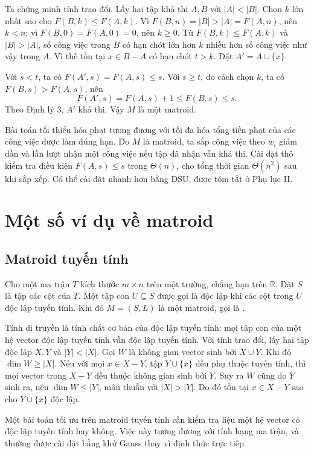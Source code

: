 \documentclass[11pt]{article}
\begin{document}
Ta chứng minh tính trao đổi. Lấy hai tập khả thi \(A,B\) với \(|A|<|B|\). Chọn
\(k\) lớn nhất sao cho \(F(B,k)\le F(A,k)\). Vì
\(F(B,n)=|B|>|A|=F(A,n)\), nên \(k<n\); vì \(F(B,0)=F(A,0)=0\), nên \(k\ge 0\).
Từ \(F(B,k)\le F(A,k)\) và \(|B|>|A|\), số công việc trong \(B\) có hạn chót
lớn hơn \(k\) nhiều hơn số công việc như vậy trong \(A\). Vì thế tồn tại
\(x\in B-A\) có hạn chót \(t>k\). Đặt \(A'=A\cup\{x\}\).

Với \(s<t\), ta có \(F(A',s)=F(A,s)\le s\). Với \(s\ge t\), do cách chọn \(k\),
ta có \(F(B,s)>F(A,s)\), nên
\[
  F(A',s)=F(A,s)+1\le F(B,s)\le s.
\]
Theo Định lý 3, \(A'\) khả thi. Vậy \(M\) là một matroid.

Bài toán tối thiểu hóa phạt tương đương với tối đa hóa tổng tiền phạt của các
công việc được làm đúng hạn. Do \(M\) là matroid, ta sắp công việc theo
\(w_i\) giảm dần và lần lượt nhận một công việc nếu tập đã nhận vẫn khả thi.
Cài đặt thô kiểm tra điều kiện \(F(A,s)\le s\) trong \(\Theta(n)\), cho tổng
thời gian \(\Theta(n^2)\) sau khi sắp xếp. Có thể cài đặt nhanh hơn bằng DSU,
được tóm tắt ở Phụ lục II.

\section{Một số ví dụ về matroid}

\subsection*{Matroid tuyến tính}

Cho một ma trận \(T\) kích thước \(m\times n\) trên một trường, chẳng hạn trên
\(\mathbb{R}\). Đặt \(S\) là tập các cột của \(T\). Một tập con \(U\subseteq S\)
được gọi là độc lập khi các cột trong \(U\) độc lập tuyến tính. Khi đó
\(M=(S,L)\) là một matroid, gọi là .

Tính di truyền là tính chất cơ bản của độc lập tuyến tính: mọi tập con của một
hệ vector độc lập tuyến tính vẫn độc lập tuyến tính. Với tính trao đổi, lấy
hai tập độc lập \(X,Y\) và \(|Y|<|X|\). Gọi \(W\) là không gian vector sinh bởi
\(X\cup Y\). Khi đó \(\dim W\ge |X|\). Nếu với mọi \(x\in X-Y\), tập
\(Y\cup\{x\}\) đều phụ thuộc tuyến tính, thì mọi vector trong \(X-Y\) đều thuộc
không gian sinh bởi \(Y\). Suy ra \(W\) cũng do \(Y\) sinh ra, nên
\(\dim W\le |Y|\), mâu thuẫn với \(|X|>|Y|\). Do đó tồn tại \(x\in X-Y\) sao
cho \(Y\cup\{x\}\) độc lập.

Một bài toán tối ưu trên matroid tuyến tính cần kiểm tra liệu một hệ vector có
độc lập tuyến tính hay không. Việc này tương đương với tính hạng ma trận, và
thường được cài đặt bằng khử Gauss thay vì định thức trực tiếp.
\end{document}
